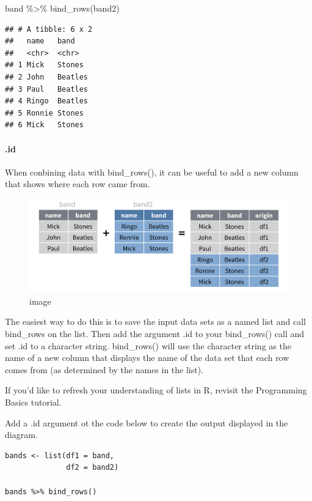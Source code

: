 \documentclass[
]{article}
\newenvironment{Shaded}{\begin{snugshade}}{\end{snugshade}}
\newcommand{\FunctionTok}[1]{\textcolor[rgb]{0.00,0.00,0.00}{#1}}
\newcommand{\NormalTok}[1]{#1}
\newcommand{\SpecialCharTok}[1]{\textcolor[rgb]{0.00,0.00,0.00}{#1}}
\begin{document}
\begin{Shaded}
\begin{Highlighting}[]
\NormalTok{band }\SpecialCharTok{\%\textgreater{}\%} \FunctionTok{bind\_rows}\NormalTok{(band2)}
\end{Highlighting}
\end{Shaded}

\begin{verbatim}
## # A tibble: 6 x 2
##   name   band   
##   <chr>  <chr>  
## 1 Mick   Stones 
## 2 John   Beatles
## 3 Paul   Beatles
## 4 Ringo  Beatles
## 5 Ronnie Stones 
## 6 Mick   Stones
\end{verbatim}

\hypertarget{id}{%
\paragraph{.id}\label{id}}

When conbining data with bind\_rows(), it can be useful to add a new
column that shows where each row came from.

\begin{figure}
\centering
\includegraphics{data/bind-rows-id.png}
\caption{image}
\end{figure}

The easiest way to do this is to save the input data sets as a named
list and call bind\_rows on the list. Then add the argument .id to your
bind\_rows() call and set .id to a character string. bind\_rows() will
use the character string as the name of a new column that displays the
name of the data set that each row comes from (as determined by the
names in the list).

If you'd like to refresh your understanding of lists in R, revisit the
Programming Basics tutorial.

Add a .id argument ot the code below to create the output displayed in
the diagram.

\begin{verbatim}
bands <- list(df1 = band, 
              df2 = band2)

bands %>% bind_rows()
\end{verbatim}
\end{document}
